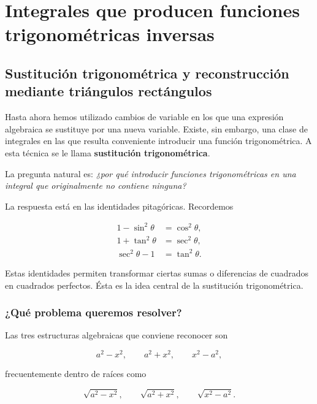 
\section{Integrales que producen funciones trigonométricas inversas}


\subsection*{Sustitución trigonométrica y reconstrucción mediante
triángulos rectángulos}

Hasta ahora hemos utilizado cambios de variable en los que una expresión
algebraica se sustituye por una nueva variable. Existe, sin embargo, una
clase de integrales en las que resulta conveniente introducir una función
trigonométrica. A esta técnica se le llama \textbf{sustitución trigonométrica}.

La pregunta natural es: \emph{¿por qué introducir funciones trigonométricas
en una integral que originalmente no contiene ninguna?}

La respuesta está en las identidades pitagóricas. Recordemos

\[
\boxed{
\begin{aligned}
1-\sin^2\theta&=\cos^2\theta,\\
1+\tan^2\theta&=\sec^2\theta,\\
\sec^2\theta-1&=\tan^2\theta.
\end{aligned}}
\]

Estas identidades permiten transformar ciertas sumas o diferencias de
cuadrados en cuadrados perfectos. Ésta es la idea central de la sustitución
trigonométrica.

\subsubsection*{¿Qué problema queremos resolver?}

Las tres estructuras algebraicas que conviene reconocer son

\[
\boxed{a^2-x^2},\qquad
\boxed{a^2+x^2},\qquad
\boxed{x^2-a^2},
\]

frecuentemente dentro de raíces como

\[
\sqrt{a^2-x^2},\qquad
\sqrt{a^2+x^2},\qquad
\sqrt{x^2-a^2}.
\]

